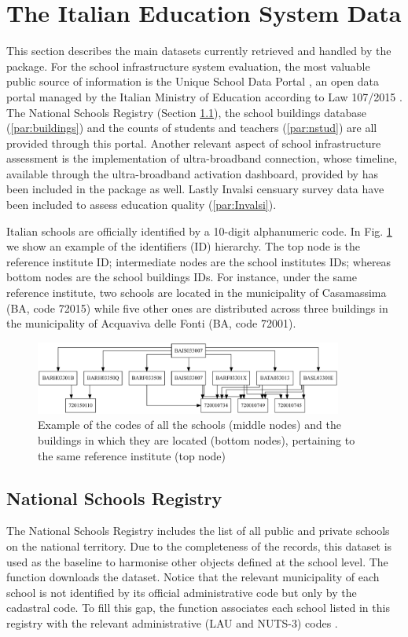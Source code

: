 \documentclass{book}
\begin{document}
\section{The Italian Education System Data} \label{section:Data}
This section describes the main datasets currently retrieved and handled by the package. For the school infrastructure system evaluation, the most valuable public source of information is the Unique School Data Portal \citep{MIUR}, an open data portal managed by the Italian Ministry of Education according to Law 107/2015 \citep{law2}. The National Schools Registry (Section \ref{par:registry}), the school buildings database (\ref{par:buildings}) and the counts of students and teachers (\ref{par:nstud}) are all provided through this portal. Another relevant aspect of school infrastructure assessment is the implementation of ultra-broadband connection, whose timeline, available through the ultra-broadband activation dashboard, provided by \cite{BB} has been included in the package as well.
Lastly Invalsi censuary survey data \citep{Invalsi_IS} have been included to assess education quality (\ref{par:Invalsi}).

Italian schools are officially identified by a 10-digit alphanumeric code. In Fig. \ref{fig:diagram} we show an example of the identifiers (ID) hierarchy. The top node is the reference institute ID; intermediate nodes are the school institutes IDs; whereas bottom nodes are the school buildings IDs. For instance, under the same reference institute, two schools are located in the municipality of Casamassima (BA, code 72015) while five other ones are distributed across three buildings in the municipality of Acquaviva delle Fonti (BA, code 72001).
\begin{figure}
  \centering
  \includegraphics[width = 0.9\textwidth]{SchoolDataIT/Fig2.pdf} 
  \caption{Example of the codes of all the schools (middle nodes) and the buildings in which they are located (bottom nodes), pertaining to the same reference institute (top node)}
  \label{fig:diagram}
\end{figure}

\subsection{National Schools Registry} \label{par:registry}
The National Schools Registry includes the list of all public and private schools on the national territory. Due to the completeness of the records, this dataset is used as the baseline to harmonise other objects defined at the school level. The function \texttt{} downloads the dataset. Notice that the relevant municipality of each school is not identified by its official administrative code but only by the cadastral code. To fill this gap, the function \texttt{} associates each school listed in this registry with the relevant administrative (LAU and NUTS-3) codes \citep{Situas}.
\end{document}
